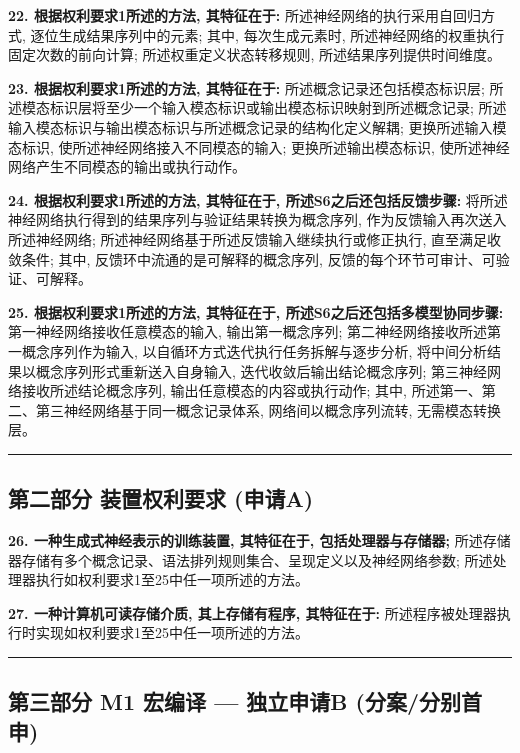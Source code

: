 \documentclass[
]{article}
\begin{document}
\textbf{22. 根据权利要求1所述的方法, 其特征在于:}
所述神经网络的执行采用自回归方式, 逐位生成结果序列中的元素; 其中,
每次生成元素时, 所述神经网络的权重执行固定次数的前向计算;
所述权重定义状态转移规则, 所述结果序列提供时间维度。

\textbf{23. 根据权利要求1所述的方法, 其特征在于:}
所述概念记录还包括模态标识层;
所述模态标识层将至少一个输入模态标识或输出模态标识映射到所述概念记录;
所述输入模态标识与输出模态标识与所述概念记录的结构化定义解耦;
更换所述输入模态标识, 使所述神经网络接入不同模态的输入;
更换所述输出模态标识, 使所述神经网络产生不同模态的输出或执行动作。

\textbf{24. 根据权利要求1所述的方法, 其特征在于,
所述S6之后还包括反馈步骤:}
将所述神经网络执行得到的结果序列与验证结果转换为概念序列,
作为反馈输入再次送入所述神经网络;
所述神经网络基于所述反馈输入继续执行或修正执行, 直至满足收敛条件; 其中,
反馈环中流通的是可解释的概念序列, 反馈的每个环节可审计、可验证、可解释。

\textbf{25. 根据权利要求1所述的方法, 其特征在于,
所述S6之后还包括多模型协同步骤:} 第一神经网络接收任意模态的输入,
输出第一概念序列; 第二神经网络接收所述第一概念序列作为输入,
以自循环方式迭代执行任务拆解与逐步分析,
将中间分析结果以概念序列形式重新送入自身输入,
迭代收敛后输出结论概念序列; 第三神经网络接收所述结论概念序列,
输出任意模态的内容或执行动作; 其中,
所述第一、第二、第三神经网络基于同一概念记录体系, 网络间以概念序列流转,
无需模态转换层。

\begin{center}\rule{0.5\linewidth}{0.5pt}\end{center}

\subsection{第二部分 装置权利要求
(申请A)}\label{ux7b2cux4e8cux90e8ux5206-ux88c5ux7f6eux6743ux5229ux8981ux6c42-ux7533ux8bf7a}

\textbf{26. 一种生成式神经表示的训练装置, 其特征在于,
包括处理器与存储器;}
所述存储器存储有多个概念记录、语法排列规则集合、呈现定义以及神经网络参数;
所述处理器执行如权利要求1至25中任一项所述的方法。

\textbf{27. 一种计算机可读存储介质, 其上存储有程序, 其特征在于:}
所述程序被处理器执行时实现如权利要求1至25中任一项所述的方法。

\begin{center}\rule{0.5\linewidth}{0.5pt}\end{center}

\subsection{第三部分 M1 宏编译 --- 独立申请B
(分案/分别首申)}\label{ux7b2cux4e09ux90e8ux5206-m1-ux5b8fux7f16ux8bd1-ux72ecux7acbux7533ux8bf7b-ux5206ux6848ux5206ux522bux9996ux7533}
\end{document}
